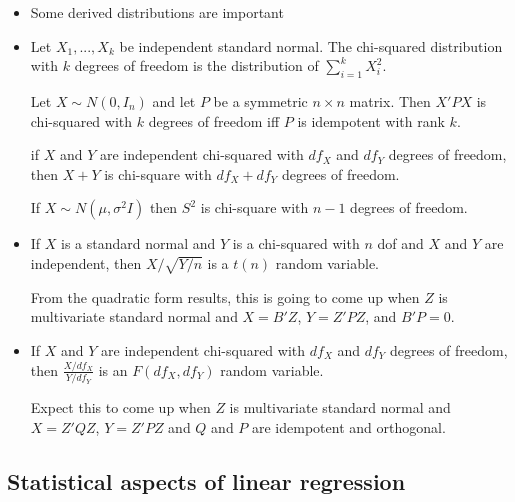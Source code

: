 \begin{itemize}[leftmargin=0pt]
\item Some derived distributions are important

\item %
  \begin{defn}
    Let $X_1,...,X_k$ be independent standard normal.  The
    chi-squared distribution with $k$ degrees of freedom is the
    distribution of $\sum_{i=1}^k X^2_i$.
  \end{defn}

  \begin{thm}
    Let $X \sim N(0, I_n)$ and let $P$ be a symmetric $n \times n$ matrix.
    Then $X'PX$ is chi-squared with $k$ degrees of freedom iff $P$ is
    idempotent with rank $k$.
  \end{thm}

  \begin{thm}
    if $X$ and $Y$ are independent chi-squared with $df_X$ and $df_Y$
    degrees of freedom, then $X + Y$ is chi-square with $df_X + df_Y$
    degrees of freedom.
  \end{thm}

  If $X \sim N(\mu, \sigma^2 I)$ then $S^2$ is chi-square with $n-1$ degrees of
  freedom.

\item %
  \begin{defn}
    If $X$ is a standard normal and $Y$ is a chi-squared with $n$ dof
    and $X$ and $Y$ are independent, then $X / \sqrt{Y/n}$ is a $t(n)$
    random variable.
  \end{defn}
  From the quadratic form results, this is going to come up when $Z$
  is multivariate standard normal and $X = B'Z$, $Y = Z'PZ$, and $B'P
  = 0$.

\item %
  \begin{defn}
    If $X$ and $Y$ are independent chi-squared with $df_X$ and $df_Y$
    degrees of freedom, then $\frac{X/df_X}{Y/df_Y}$ is an $F(df_X,
    df_Y)$ random variable.
  \end{defn}

  Expect this to come up when $Z$ is multivariate standard normal and
  $X = Z'QZ$, $Y = Z'PZ$ and $Q$ and $P$ are idempotent and orthogonal.

\end{itemize}

\subsection{Statistical aspects of linear regression}

